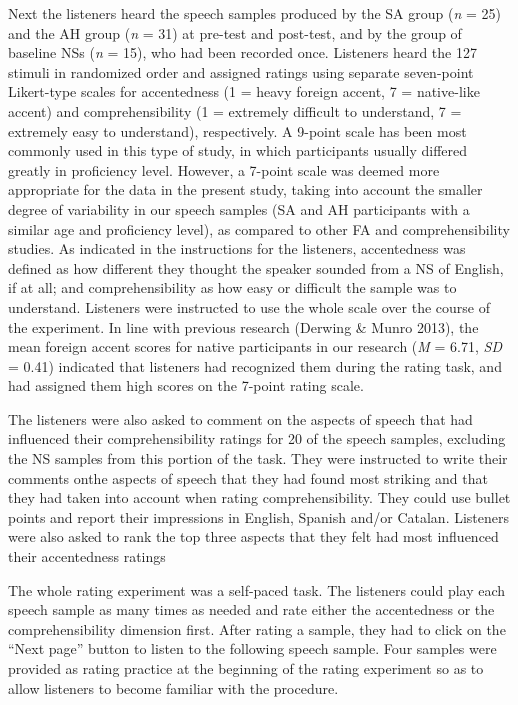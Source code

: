 \documentclass[12pt]{article}
\newenvironment{styleStandard}{\setlength\leftskip{0cm}\setlength\rightskip{0cm plus 1fil}\setlength\parindent{0cm}\setlength\parfillskip{0pt plus 1fil}\setlength\parskip{0in plus 1pt}\writerlistparindent\writerlistleftskip\leavevmode\normalfont\normalsize\writerlistlabel\ignorespaces}{\unskip\vspace{0.111in plus 0.0111in}\par}
\newcommand\writerlistleftskip{}
\newcommand\writerlistparindent{}
\newcommand\writerlistlabel{}
\begin{document}
\begin{styleStandard}
Next the listeners heard the speech samples produced by the SA group (\textit{n} = 25) and the AH group (\textit{n }= 31) at pre-test and post-test, and by the group of baseline NSs (\textit{n} = 15), who had been recorded once. Listeners heard the 127 stimuli in randomized order and assigned ratings using separate seven-point Likert-type scales for accentedness (1 = heavy foreign accent, 7 = native-like accent) and comprehensibility (1 = extremely difficult to understand, 7 = extremely easy to understand), respectively. A 9-point scale has been most commonly used in this type of study, in which participants usually differed greatly in proficiency level. However, a 7-point scale was deemed more appropriate for the data in the present study, taking into account the smaller degree of variability in our speech samples (SA and AH participants with a similar age and proficiency level), as compared to other FA and comprehensibility studies. As indicated in the instructions for the listeners, accentedness was defined as how different they thought the speaker sounded from a NS of English, if at all; and comprehensibility as how easy or difficult the sample was to understand. Listeners were instructed to use the whole scale over the course of the experiment. In line with previous research (Derwing \& Munro 2013), the mean foreign accent scores for native participants in our research (\textit{M} = 6.71, \textit{SD} = 0.41) indicated that listeners had recognized them during the rating task, and had assigned them high scores on the 7-point rating scale. 
\end{styleStandard}

\begin{styleStandard}
The listeners were also asked to comment on the aspects of speech that had influenced their comprehensibility ratings for 20 of the speech samples, excluding the NS samples from this portion of the task. They were instructed to write their comments onthe aspects of speech that they had found most striking and that they had taken into account when rating comprehensibility. They could use bullet points and report their impressions in English, Spanish and/or Catalan. Listeners were also asked to rank the top three aspects that they felt had most influenced their accentedness ratings
\end{styleStandard}

\begin{styleStandard}
The whole rating experiment was a self-paced task. The listeners could play each speech sample as many times as needed and rate either the accentedness or the comprehensibility dimension first. After rating a sample, they had to click on the “Next page” button to listen to the following speech sample. Four samples were provided as rating practice at the beginning of the rating experiment so as to allow listeners to become familiar with the procedure. 
\end{styleStandard}
\end{document}
